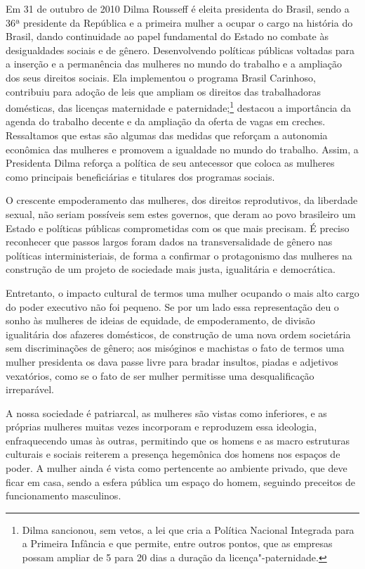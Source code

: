 Em 31 de outubro de 2010 Dilma Rousseff é eleita presidenta do Brasil,
sendo a 36ª presidente da República e a primeira mulher a ocupar o cargo
na história do Brasil, dando continuidade ao papel fundamental do
Estado no combate às desigualdades sociais e de gênero. Desenvolvendo
políticas públicas voltadas para a inserção e a permanência das mulheres
no mundo do trabalho e a ampliação dos seus direitos sociais. Ela
implementou o programa Brasil Carinhoso, contribuiu para adoção de leis
que ampliam os direitos das trabalhadoras domésticas, das licenças
maternidade e paternidade;\footnote{Dilma sancionou, sem vetos, a lei que
  cria a Política Nacional Integrada para a Primeira Infância e que
  permite, entre outros pontos, que as empresas possam ampliar de 5 para
  20 dias a duração da licença"-paternidade.} destacou a importância da
agenda do trabalho decente e da ampliação da oferta de vagas em creches.
Ressaltamos que estas são algumas das medidas que reforçam a autonomia
econômica das mulheres e promovem a igualdade no mundo do trabalho. Assim, a
Presidenta Dilma reforça a política de seu antecessor que coloca as
mulheres como principais beneficiárias e titulares dos programas
sociais.

O crescente empoderamento das mulheres, dos direitos reprodutivos, da
liberdade sexual, não seriam possíveis sem estes governos, que deram ao
povo brasileiro um Estado e políticas públicas comprometidas com os que
mais precisam. É preciso reconhecer que passos largos foram dados na
transversalidade de gênero nas políticas interministeriais, de forma a
confirmar o protagonismo das mulheres na construção de um projeto de
sociedade mais justa, igualitária e democrática.

Entretanto, o impacto cultural de termos uma mulher ocupando o mais alto
cargo do poder executivo não foi pequeno. Se por um lado essa
representação deu o sonho às mulheres de ideias de equidade, de
empoderamento, de divisão igualitária dos afazeres domésticos, de
construção de uma nova ordem societária sem discriminações de gênero;
aos misóginos e machistas o fato de termos uma mulher presidenta os dava
passe livre para bradar insultos, piadas e adjetivos vexatórios, como se
o fato de ser mulher permitisse uma desqualificação irreparável.

A nossa sociedade é patriarcal, as mulheres são vistas como
inferiores, e as próprias mulheres muitas vezes incorporam e reproduzem
essa ideologia, enfraquecendo umas às outras, permitindo que os homens e
as macro estruturas culturais e sociais reiterem a presença hegemônica
dos homens nos espaços de poder. A mulher ainda é vista como pertencente
ao ambiente privado, que deve ficar em casa, sendo a esfera pública um
espaço do homem, seguindo preceitos de funcionamento masculinos.

